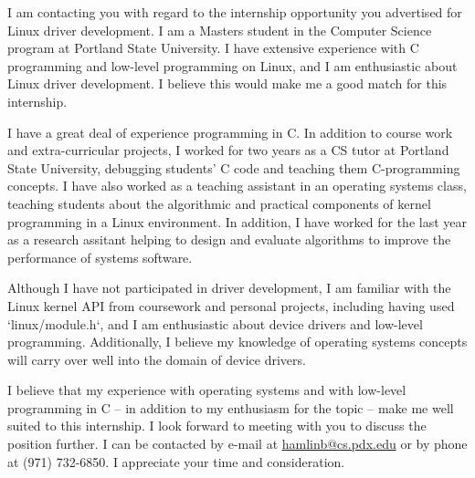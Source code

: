\documentclass[10pt,stdletter,dateno,sigleft]{newlfm} %
\begin{document}
\begin{newlfm}


I am contacting you with regard to the internship opportunity you advertised for
Linux driver development. I am a Masters student in the Computer Science program
at Portland State University. I have extensive experience with C programming and
low-level programming on Linux, and I am enthusiastic about Linux driver
development. I believe this would make me a good match for this internship.

I have a great deal of experience programming in C. In addition to course work
and extra-curricular projects, I worked for two years as a CS tutor at Portland
State University, debugging students' C code and teaching them C-programming
concepts. I have also worked as a teaching assistant in an operating systems
class, teaching students about the algorithmic and practical components of
kernel programming in a Linux environment. In addition, I have worked for the
last year as a research assitant helping to design and evaluate algorithms to
improve the performance of systems software.

Although I have not participated in driver development, I am familiar with the
Linux kernel API from coursework and personal projects, including having used
`linux/module.h`, and I am enthusiastic about device drivers and low-level
programming. Additionally, I believe my knowledge of operating systems concepts
will carry over well into the domain of device drivers.

I believe that my experience with operating systems and with low-level
programming in C -- in addition to my enthusiasm for the topic -- make me well
suited to this internship. I look forward to meeting with you to discuss the
position further. I can be contacted by e-mail at
\href{mailto:hamlinb@cs.pdx.edu}{hamlinb@cs.pdx.edu} or by phone at
(971) 732-6850. I appreciate your time and consideration.


\end{newlfm}
\end{document}
